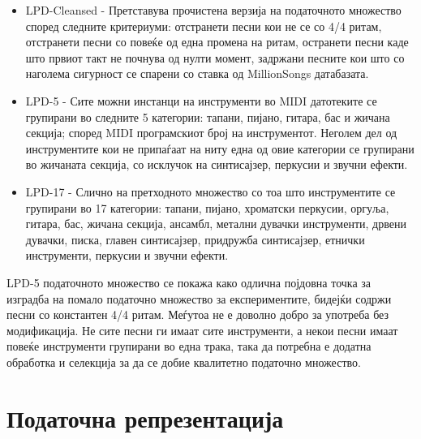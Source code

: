\begin{itemize}
    \item LPD-Cleansed - Претставува прочистена верзија на податочното множество според следните критериуми: отстранети песни кои не се со 4/4 ритам, отстранети песни со повеќе од една промена на ритам, остранети песни каде што првиот такт не почнува од нулти момент, задржани песните кои што со наголема сигурност се спарени со ставка од MillionSongs датабазата.
    \item LPD-5 - Сите можни инстанци на инструменти во MIDI датотеките се групирани во следните 5 категории: тапани, пијано, гитара, бас и жичана секција; според MIDI програмскиот број на инструментот. Неголем дел од инструментите кои не припаѓаат на ниту една од овие категории се групирани во жичаната секција, со исклучок на синтисајзер, перкусии и звучни ефекти.
    \item LPD-17 - Слично на претходното множество со тоа што инструментите се групирани во 17 категории: тапани, пијано, хроматски перкусии, оргуља, гитара, бас, жичана секција, ансамбл, метални дувачки инструменти, дрвени дувачки, писка, главен синтисајзер, придружба синтисајзер, етнички инструменти, перкусии и звучни ефекти.
\end{itemize}

LPD-5 податочното множество се покажа како одлична појдовна точка за изградба на помало податочно множество за експериментите, бидејќи содржи песни со константен 4/4 ритам. Меѓутоа не е доволно добро за употреба без модификација. Не сите песни ги имаат сите инструменти, а некои песни имаат повеќе инструменти групирани во една трака, така да потребна е додатна обработка и селекција за да се добие квалитетно податочно множество.

\section{Податочна репрезентација}

